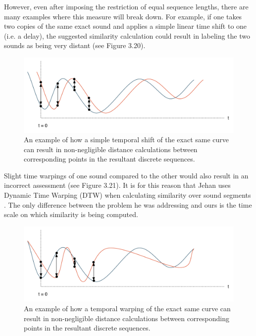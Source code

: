 \documentclass[12pt]{report} 	%
\numberwithin{figure}{chapter}
\numberwithin{table}{chapter}
\numberwithin{equation}{chapter}
\begin{document}
\begin{flushleft}
However, even after imposing the restriction of equal sequence lengths, there are many examples where this measure will break down. For example, if one takes two copies of the same exact sound and applies a simple linear time shift to one (i.e. a delay), the suggested similarity calculation could result in labeling the two sounds as being very distant (see Figure 3.20).
\begin{figure}[h!]
\begin{center}
\includegraphics[scale=0.6]{TimbreDistance3}
\caption[Timbre distance between time-shifted curves]{An example of how a simple temporal shift of the exact same curve can result in non-negligible distance calculations between corresponding points in the resultant discrete sequences.}
\end{center}
\end{figure}

Slight time warpings of one sound compared to the other would also result in an incorrect assessment (see Figure 3.21). It is for this reason that Jehan uses Dynamic Time Warping (DTW) when calculating similarity over sound segments \cite{Jehan:2005fy}. The only difference between the problem he was addressing and ours is the time scale on which similarity is being computed.
\begin{figure}[h!]
\begin{center}
\includegraphics[scale=0.6]{TimbreDistance4}
\caption[Timbre distance between time-warped curves]{An example of how a temporal warping of the exact same curve can result in non-negligible distance calculations between corresponding points in the resultant discrete sequences.}
\end{center}
\end{figure}


\end{flushleft}
\end{document}
